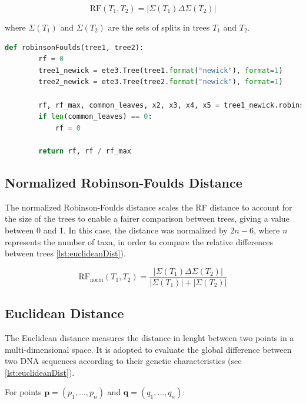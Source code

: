 \begin{equation}
    \text{RF}(T_1, T_2) = | \Sigma(T_1) \Delta \Sigma(T_2) |
\end{equation}

where $\Sigma(T_1)$ and $\Sigma(T_2)$ are the sets of splits in trees $T_1$ and $T_2$.

\begin{lstlisting}[label=lst:robinsonFoulds,language=Python,caption=Python script for calculating the Robinson-Foulds distance using the ete3 package in the aPhyloGeo package]
    def robinsonFoulds(tree1, tree2):
        rf = 0
        tree1_newick = ete3.Tree(tree1.format("newick"), format=1)
        tree2_newick = ete3.Tree(tree2.format("newick"), format=1)

        rf, rf_max, common_leaves, x2, x3, x4, x5 = tree1_newick.robinson_foulds(tree2_newick, unrooted_trees=True)
        if len(common_leaves) == 0:
            rf = 0

        return rf, rf / rf_max
\end{lstlisting}


\subsection{Normalized Robinson-Foulds Distance}\label{RFnorm}
The normalized Robinson-Foulds distance scales the RF distance to account for the size of the trees to enable a fairer comparison between trees, giving a value between 0 and 1. In this case, the distance was normalized by $2n-6$, where $n$ represents the number of taxa, in order to compare the relative differences between trees \autoref{lst:euclideanDist}).

\begin{equation}
    \text{RF}_{\text{norm}}(T_1, T_2) = \frac{| \Sigma(T_1) \Delta \Sigma(T_2) |}{| \Sigma(T_1) | + | \Sigma(T_2) |}
\end{equation}

\subsection{Euclidean Distance}\label{euclidean}
The Euclidean distance measures the distance in lenght between two points in a multi-dimensional space. It is adopted to evaluate the global difference between two DNA sequences according to their genetic characteristics (see \autoref{lst:euclideanDist}).

For points $\mathbf{p} = (p_1, \ldots, p_n)$ and $\mathbf{q} = (q_1, \ldots, q_n)$:


